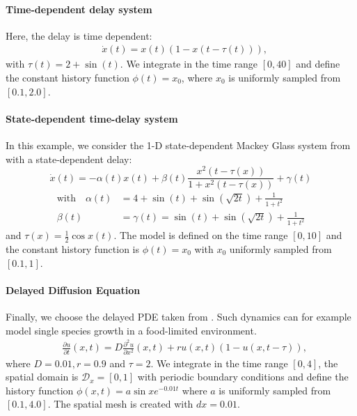 \paragraph{Time-dependent delay system} Here, the delay is time dependent:
%
\begin{equation}
\begin{aligned}
&\dot{x}(t) = x(t) (1 - x(t-\tau(t))),
\end{aligned}
\end{equation}
%
with $\tau(t) = 2 + \sin(t)$. We integrate in the time range $[0,40]$ and define the constant history function $\phi(t) = x_0$, where $x_0$ is uniformly sampled from $[0.1,2.0]$.

\paragraph{State-dependent time-delay system} In this example, we consider the 1-D state-dependent Mackey Glass system from \citet{state_dependent_mg} with a state-dependent delay:
%
\begin{equation}
\dot{x}(t) = -\alpha(t) x(t) + \beta(t) \frac{ x^2(t - \tau(x))}{1 + x^2(t - \tau(x))} + \gamma(t)
\end{equation}
\begin{equation}
\begin{aligned}
\text{with} \quad \alpha(t) & = 4 + \sin(t) + \sin(\sqrt{2t}) + \frac{1}{1 + t^2} \\
 \beta(t) & = \gamma(t) = \sin(t) + \sin(\sqrt{2t}) + \frac{1}{1 + t^2}
\end{aligned}
\end{equation}
%
and $\tau(x) = \frac{1}{2} \cos{x(t)}$. The model is defined on the time range $[0,10]$ and the constant history function is $\phi(t) = x_0$ with $x_0$ uniformly sampled from $[0.1,1]$.

\paragraph{Delayed Diffusion Equation} Finally, we choose the delayed PDE taken from \citet{arino2009delay}. Such dynamics can for example model single species growth in a food-limited environment.
%
\begin{equation}
\begin{aligned}
&\frac{\partial u}{\partial t}(x,t) = D \frac{\partial^2 u}{\partial x^2}(x,t) + r u(x,t) \left( 1 - u(x,t-\tau) \right),
\end{aligned}
\end{equation}
%
where $D=0.01, r=0.9$ and $\tau=2$. We integrate in the time range $[0,4]$, the spatial domain is $\mathcal{D}_x = [0,1]$ with periodic boundary conditions and define the history function $\phi(x, t) = a \sin{x} e^{-0.01t} $ where $a$ is uniformly sampled from $[0.1,4.0]$. The spatial mesh is created with $dx=0.01$.

